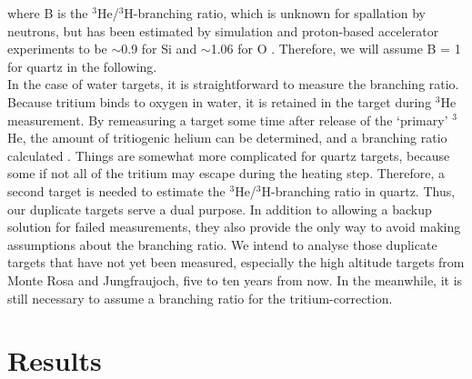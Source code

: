 \documentclass{article}
\begin{document}
where  B is  the $^3$He/$^3$H-branching  ratio, which  is  unknown for
spallation  by neutrons,  but  has been  estimated  by simulation  and
proton-based  accelerator  experiments  to  be $\sim$0.9  for  Si  and
$\sim$1.06 for  O \citep{leya2009}.  Therefore,  we will assume B  = 1
for quartz in the following.  \\

In the  case of  water targets, it  is straightforward to  measure the
branching  ratio. Because  tritium binds  to  oxygen in  water, it  is
retained  in the target  during $^3$He  measurement. By  remeasuring a
target some time after release  of the `primary' $^3$He, the amount of
tritiogenic helium can be determined, and a branching ratio calculated
\citep{brown2000}.   Things are somewhat  more complicated  for quartz
targets, because some if not all  of the tritium may escape during the
heating step.  Therefore, a  second target is  needed to  estimate the
$^3$He/$^3$H-branching ratio  in quartz.  Thus,  our duplicate targets
serve a  dual purpose. In addition  to allowing a  backup solution for
failed measurements,  they also provide  the only way to  avoid making
assumptions  about the  branching ratio.  We intend  to  analyse those
duplicate targets that have not yet been measured, especially the high
altitude targets from  Monte Rosa and Jungfraujoch, five  to ten years
from  now.   In the  meanwhile,  it is  still  necessary  to assume  a
branching ratio for the tritium-correction.

\section{Results}\label{sec:results}
\end{document}
